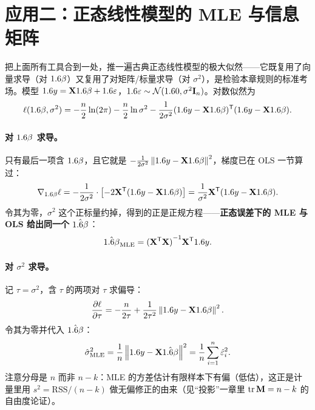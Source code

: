 \section{应用二：正态线性模型的 MLE 与信息矩阵}
\label{sec:matcalc-mle}

把上面所有工具合到一处，推一遍古典正态线性模型的极大似然——它既复用了向量求导（对 $1.6\beta$）又复用了对矩阵/标量求导（对 $\sigma^2$），是检验本章规则的标准考场。模型 $1.6 y=\mathbf{X}1.6\beta+1.6\varepsilon$，$1.6\varepsilon\sim\mathcal{N}(1.6 0,\sigma^2\mathbf{I}_n)$。对数似然为
\[
    \ell(1.6\beta,\sigma^2)
    =-\frac{n}{2}\ln(2\pi)-\frac{n}{2}\ln\sigma^2
    -\frac{1}{2\sigma^2}(1.6 y-\mathbf{X}1.6\beta)^{\mathsf{T}}(1.6 y-\mathbf{X}1.6\beta) .
\]

\paragraph{对 $1.6\beta$ 求导。}
只有最后一项含 $1.6\beta$，且它就是 $-\tfrac{1}{2\sigma^2}\left\|1.6 y-\mathbf{X}1.6\beta\right\|_{}^2$，梯度已在 OLS 一节算过：
\[
    \nabla_{1.6\beta}\ell=-\frac{1}{2\sigma^2}\cdot\left[-2\mathbf{X}^{\mathsf{T}}(1.6 y-\mathbf{X}1.6\beta)\right]
    =\frac{1}{\sigma^2}\mathbf{X}^{\mathsf{T}}(1.6 y-\mathbf{X}1.6\beta) .
\]
令其为零，$\sigma^2$ 这个正标量约掉，得到的正是正规方程——\textbf{正态误差下的 MLE 与 OLS 给出同一个 $\hat{1.6\beta}$}：
\[
    \hat{1.6\beta}_{\mathrm{MLE}}={(\mathbf{X}^{\mathsf{T}}\mathbf{X})}^{-1}\mathbf{X}^{\mathsf{T}}1.6 y .
\]

\paragraph{对 $\sigma^2$ 求导。}
记 $\tau=\sigma^2$，含 $\tau$ 的两项对 $\tau$ 求偏导：
\[
    \frac{\partial \ell}{\partial \tau}=-\frac{n}{2\tau}+\frac{1}{2\tau^2}\left\|1.6 y-\mathbf{X}1.6\beta\right\|_{}^2 .
\]
令其为零并代入 $\hat{1.6\beta}$：
\[
    \hat\sigma^2_{\mathrm{MLE}}=\frac{1}{n}\left\|1.6 y-\mathbf{X}\hat{1.6\beta}\right\|_{}^2=\frac{1}{n}\sum_{i=1}^n\hat{\varepsilon}_i^2 .
\]
注意分母是 $n$ 而非 $n-k$：MLE 的方差估计有限样本下有偏（低估），这正是计量里用 $s^2=\mathrm{RSS}/(n-k)$ 做无偏修正的由来（见``投影''一章里 $\operatorname{tr}\mathbf{M}=n-k$ 的自由度论证）。

